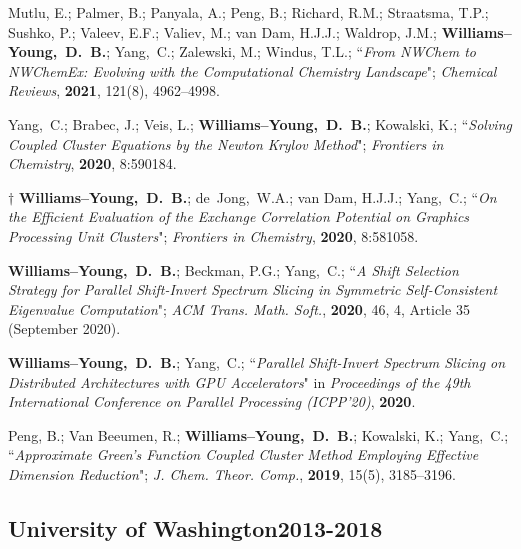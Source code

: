 \documentclass[10pt]{res} %
\newcommand*\me[0]{{\bf Williams--Young,~D.~B.}}
\newcommand*\cy[0]{Yang,~C.}
\newcommand*\bdj[0]{de~Jong,~W.A.}
\begin{document}
\begin{resume}
\begin{etaremune}
        Mutlu, E.; Palmer, B.; Panyala, A.; Peng, B.; Richard, R.M.; Straatsma, T.P.; Sushko, P.; Valeev, E.F.;
        Valiev, M.; van Dam, H.J.J.; Waldrop, J.M.; \me; \cy; Zalewski, M.; Windus, T.L.;
       ``\emph{From NWChem to NWChemEx: Evolving with the Computational Chemistry Landscape}"; \emph{Chemical Reviews},
       \textbf{2021}, 121(8), 4962--4998.
  \item \cy; Brabec, J.; Veis, L.; \me; Kowalski, K.;
        ``\emph{Solving Coupled Cluster Equations by the Newton Krylov Method}";
        \emph{Frontiers in Chemistry}, \textbf{2020}, 8:590184.
  \item $\dagger$ \me; \bdj; van Dam, H.J.J.; \cy;
        ``\emph{On the Efficient Evaluation of the Exchange Correlation Potential on Graphics Processing Unit Clusters}";
        \emph{Frontiers in Chemistry}, \textbf{2020}, 8:581058.
  \item \me; Beckman, P.G.; \cy;
        ``\emph{A Shift Selection Strategy for Parallel Shift-Invert Spectrum Slicing in Symmetric Self-Consistent 
        Eigenvalue Computation}";
        \emph{ACM Trans. Math. Soft.}, \textbf{2020}, 46, 4, Article 35 (September 2020).
  \item \me; \cy;
        ``\emph{Parallel Shift-Invert Spectrum Slicing on Distributed Architectures with GPU Accelerators}"
        in \emph{Proceedings of the 49th International Conference on Parallel Processing (ICPP'20)}, \textbf{2020}.
  \item Peng, B.; Van Beeumen, R.; \me; Kowalski, K.; \cy;
        ``\emph{Approximate Green’s Function Coupled Cluster Method Employing 
          Effective Dimension Reduction}";
        \emph{J. Chem. Theor. Comp.}, \textbf{2019}, 15(5), 3185--3196.
\end{etaremune}

\subsection{University of Washington\hfill 2013-2018}


\end{resume}
\end{document}
